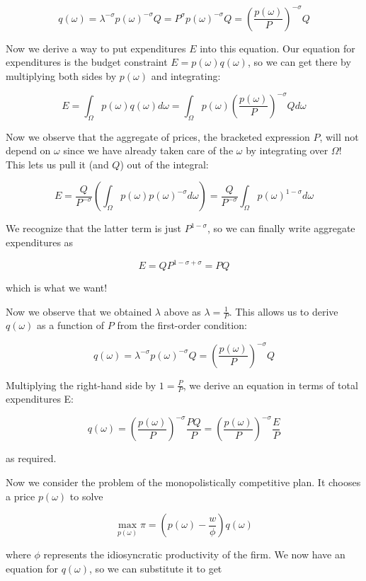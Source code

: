 \documentclass[12pt, letterpaper]{article}
\begin{document}
	\[ q(\omega) = \lambda^{-\sigma} p(\omega)^{-\sigma} Q = P^{\sigma} p(\omega)^{-\sigma} Q = \left(\frac{p(\omega)}{P}\right)^{-\sigma} Q    \]

	Now we derive a way to put expenditures \(E\) into this equation. Our equation for expenditures is the budget constraint \(E = p(\omega) q(\omega)\), so we can get there by multiplying both sides by \(p(\omega)\) and integrating:
	
	\[ E = \int_{\Omega} p(\omega) q(\omega) d\omega = \int_{\Omega} p(\omega) \left(\frac{p(\omega)}{P}\right)^{-\sigma} Q  d\omega   \]
	
	Now we observe that the aggregate of prices, the bracketed expression \( P \), will not depend on \(\omega\) since we have already taken care of the \(\omega\) by integrating over \(\Omega\)! This lets us pull it (and \(Q\)) out of the integral:

	\[ E = \frac{Q}{P^{-\sigma}} \left( \int_{\Omega} p(\omega) p(\omega)^{-\sigma} d\omega \right) = \frac{Q}{P^{-\sigma}} \int_{\Omega} p(\omega)^{1 -\sigma} d\omega \]

	We recognize that the latter term is just \( P^{1 - \sigma}  \), so we can finally write aggregate expenditures as

	\[ E = Q P^{1 - \sigma + \sigma} = P Q   \]

	which is what we want!

	Now we observe that we obtained \(\lambda\) above as \(\lambda = \frac{1}{P}\). This allows us to derive \(q(\omega)\) as a function of \(P\) from the first-order condition: 

	\[ q(\omega) = \lambda^{-\sigma} p(\omega)^{-\sigma} Q = \left(\frac{p(\omega)}{P}\right)^{-\sigma} Q  \]

	Multiplying the right-hand side by \(1 = \frac{P}{P}\), we derive an equation in terms of total expenditures E:

	\[ q(\omega) = \left(\frac{p(\omega)}{P}\right)^{-\sigma} \frac{PQ}{P} = \left(\frac{p(\omega)}{P}\right)^{-\sigma} \frac{E}{P} \] 

	as required.

	Now we consider the problem of the monopolistically competitive plan. It chooses a price \(p(\omega)\) to solve

	\[ \max_{p(\omega)} \pi = \left( p(\omega) - \frac{w}{\phi} \right)  q(\omega)   \]

	where \(\phi\) represents the idiosyncratic productivity of the firm. We now have an equation for \(q(\omega)\), so we can substitute it to get 
\end{document}
